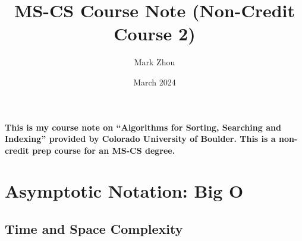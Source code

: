 \documentclass{article}
\title{MS-CS Course Note (Non-Credit Course 2)}
\author{Mark Zhou}
\date{March 2024}
\begin{document}
\maketitle
\doublespacing

\paragraph{This is my course note on “Algorithms for Sorting, Searching and Indexing” provided by Colorado University of Boulder. 
This is a non-credit prep course for an MS-CS degree.}

\newpage
\tableofcontents
\newpage

\section{Asymptotic Notation: Big O}

\subsection{Time and Space Complexity}
\end{document}
